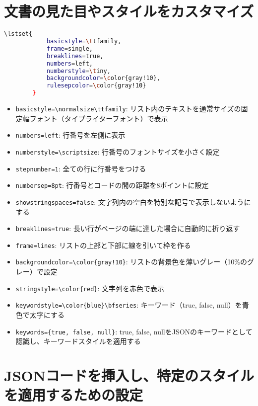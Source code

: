 \documentclass{article}
\begin{document}
    \part{文書の見た目やスタイルをカスタマイズ}

    \begin{lstlisting}[language=bash]
        \lstset{
            basicstyle=\ttfamily,
            frame=single,
            breaklines=true,
            numbers=left,
            numberstyle=\tiny,
            backgroundcolor=\color{gray!10},
            rulesepcolor=\color{gray!10}  
        }
    \end{lstlisting}

        \begin{itemize}
            \item \texttt{basicstyle=\textbackslash normalsize\textbackslash ttfamily}: リスト内のテキストを通常サイズの固定幅フォント（タイプライターフォント）で表示
            \item \texttt{numbers=left}: 行番号を左側に表示
            \item \texttt{numberstyle=\textbackslash scriptsize}: 行番号のフォントサイズを小さく設定
            \item \texttt{stepnumber=1}: 全ての行に行番号をつける
            \item \texttt{numbersep=8pt}: 行番号とコードの間の距離を8ポイントに設定
            \item \texttt{showstringspaces=false}: 文字列内の空白を特別な記号で表示しないようにする
            \item \texttt{breaklines=true}: 長い行がページの端に達した場合に自動的に折り返す
            \item \texttt{frame=lines}: リストの上部と下部に線を引いて枠を作る
            \item \texttt{backgroundcolor=\textbackslash color\{gray!10\}}: リストの背景色を薄いグレー（10\%のグレー）で設定
            \item \texttt{stringstyle=\textbackslash color\{red\}}: 文字列を赤色で表示
            \item \texttt{keywordstyle=\textbackslash color\{blue\}\textbackslash bfseries}: キーワード（true, false, null）を青色で太字にする
            \item \texttt{keywords=\{true, false, null\}}: true, false, nullをJSONのキーワードとして認識し、キーワードスタイルを適用する
        \end{itemize}

    \part{JSONコードを挿入し、特定のスタイルを適用するための設定}
\end{document}
